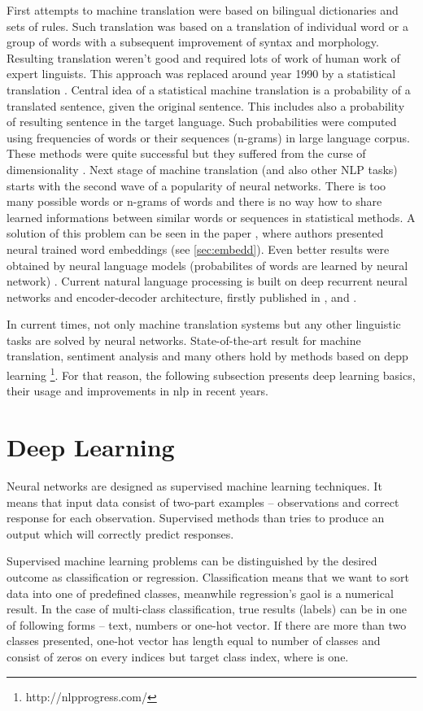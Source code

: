 First attempts to machine translation were based on bilingual dictionaries and sets of rules. Such translation was based on a translation of individual word or a group of words with a subsequent improvement of syntax and morphology. Resulting translation weren't good and required lots of work of human work of expert linguists. This approach was replaced around year 1990 by a statistical translation \citep{Brown}. Central idea of a statistical machine translation is a probability of a translated sentence, given the original sentence. This includes also a probability of resulting sentence in the target language. Such probabilities were computed using frequencies of words or their sequences (n-grams) in large language corpus. \citep{jurafsky2012natural} %
These methods were quite successful but they suffered from the curse of dimensionality \citep[p.450]{Goodfellow-et-al-2016}.  %
Next stage of machine translation (and also other NLP tasks) starts with the second wave of a popularity of neural networks.
There is too many possible words or n-grams of words and there is no way how to share learned informations between similar words or sequences in statistical methods. A solution of this problem can be seen in the paper \citep{Bengio2003}, where authors presented neural trained word embeddings (see \ref{sec:embedd}). Even better results were obtained by neural language models (probabilites of words are learned by neural network) \citep{Schwenk2006}. Current natural language processing is built on deep recurrent neural networks and encoder-decoder architecture, firstly published in \citep{Cho2014}, \citep{Sutskever2014} and \citep{Wu2016}.

In current times, not only machine translation systems but any other linguistic tasks are solved by neural networks. State-of-the-art result for machine translation, sentiment analysis and many others hold by methods based on depp learning \footnote{http://nlpprogress.com/}. For that reason, the following subsection presents deep learning basics, their usage and improvements in \gls{nlp} in recent years.

\section{Deep Learning}
Neural networks are designed as supervised machine learning techniques. It means that input data consist of two-part examples -- observations and correct response for each observation. Supervised methods than tries to produce an output which will correctly predict responses. \citep{Russell1995}
\par
Supervised machine learning problems can be distinguished by the desired outcome as classification or regression. Classification means that we want to sort data into one of predefined classes, meanwhile regression's gaol is a numerical result. In the case of multi-class classification, true results (labels) can be in one of following forms --  text, numbers or one-hot vector. If there are more than two classes presented, one-hot vector has length equal to number of classes and consist of zeros on every indices but target class index, where is one.


